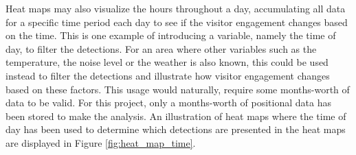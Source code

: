 Heat maps may also visualize the hours throughout a day, accumulating all data for a specific time period each day to see if the visitor engagement changes based on the time. This is one example of introducing a variable, namely the time of day, to filter the detections. For an area where other variables such as the temperature, the noise level or the weather is also known, this could be used instead to filter the detections and illustrate how visitor engagement changes based on these factors. This usage would naturally, require some months-worth of data to be valid. For this project, only a months-worth of positional data has been stored to make the analysis. An illustration of heat maps where the time of day has been used to determine which detections are presented in the heat maps are displayed in Figure \ref{fig:heat_map_time}.

